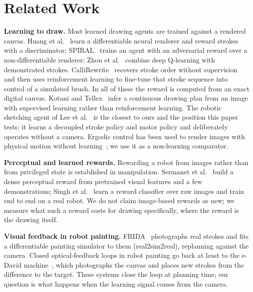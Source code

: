 \documentclass[conference]{IEEEtran}
\begin{document}
\section{Related Work}
\textbf{Learning to draw.} Most learned drawing agents are trained against a rendered
canvas. Huang et al.~\cite{D02} learn a differentiable neural renderer and reward strokes
with a discriminator; SPIRAL~\cite{D05,D06} trains an agent with an adversarial reward
over a non-differentiable renderer; Zhou et al.~\cite{D07} combine deep Q-learning with
demonstrated strokes. CalliRewrite~\cite{D09} recovers stroke order without supervision
and then uses reinforcement learning to fine-tune that stroke sequence into control of a
simulated brush. In all of these the
reward is computed from an exact digital canvas. Kotani and Tellex~\cite{D03} infer a
continuous drawing plan from an image with supervised learning rather than reinforcement
learning. The robotic sketching agent of Lee et al.~\cite{D01} is the closest to ours and
the position this paper tests: it learns a decoupled stroke policy and motor policy and
deliberately operates without a camera. Ergodic control has been used to render images
with physical motion without learning~\cite{D04}; we use it as a non-learning comparator.

\textbf{Perceptual and learned rewards.} Rewarding a robot from images rather than from
privileged state is established in manipulation. Sermanet et al.~\cite{R01} build a dense
perceptual reward from pretrained visual features and a few demonstrations; Singh et
al.~\cite{R02} learn a reward classifier over raw images and train end to end on a real
robot. We do not claim image-based rewards as new; we measure what such a reward costs
for drawing specifically, where the reward is the drawing itself.

\textbf{Visual feedback in robot painting.} FRIDA~\cite{A01} photographs real strokes and
fits a differentiable painting simulator to them (real2sim2real), replanning against the
camera. Closed optical-feedback loops in robot painting go back at least to the
e-David machine~\cite{A09}, which photographs the canvas and places new strokes from the
difference to the target. These systems close the loop
at planning time; our question is what happens when the learning signal comes from the
camera.
\end{document}
